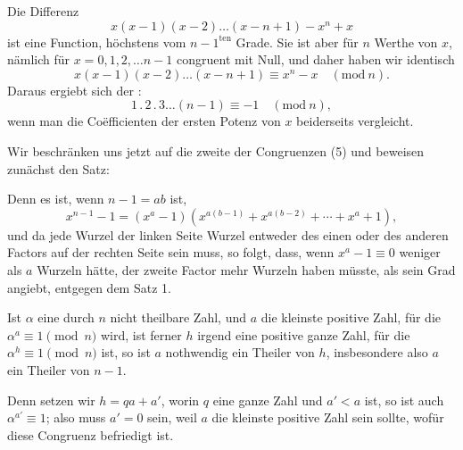 Die Differenz
\[
x(x-1)(x-2)\dots(x-n+1) - x^n + x
\]
ist eine Function, h\"ochstens vom $n-1^{\text{ten}}$ Grade. Sie ist aber
f\"ur $n$ Werthe von $x$, n\"amlich f\"ur $x = 0, 1, 2, \dots n-1$ congruent mit Null, und daher haben wir identisch
\[
x(x-1)(x-2)\dots(x-n+1) \equiv x^n - x \quad (\mathrm{mod}\ n).
\]
Daraus ergiebt sich der :
\[
1\,.\,2\,.\,3\dots(n-1) \equiv -1 \quad (\mathrm{mod}\ n),
\]
wenn man die Co\"efficienten der ersten Potenz von $x$ beiderseits
vergleicht.

Wir beschr\"anken uns jetzt auf die zweite der Congruenzen (5)
und beweisen zun\"achst den Satz:


Denn es ist, wenn $n-1 = ab$ ist,
\[
x^{n-1} - 1 = (x^a - 1)(x^{a(b-1)} + x^{a(b-2)} + \cdots + x^a + 1),
\]
und da jede Wurzel der linken Seite Wurzel entweder des einen
oder des anderen Factors auf der rechten Seite sein muss, so
folgt, dass, wenn $x^a - 1 \equiv 0$ weniger als $a$ Wurzeln h\"atte, der
zweite Factor mehr Wurzeln haben m\"usste, als sein Grad angiebt,
entgegen dem Satz 1.

Ist $\alpha$ eine durch $n$ nicht theilbare Zahl, und $a$ die kleinste
positive Zahl, f\"ur die $\alpha^a \equiv 1 \pmod n$ wird, ist ferner $h$ irgend
eine positive ganze Zahl, f\"ur die $\alpha^h \equiv 1 \pmod n$ ist, so ist $a$
nothwendig ein Theiler von $h$, insbesondere also $a$ ein Theiler
von $n - 1$.

Denn setzen wir $h = qa + a'$, worin $q$ eine ganze Zahl und
$a' < a$ ist, so ist auch $\alpha^{a'} \equiv 1$; also muss $a' = 0$ sein, weil $a$ die
kleinste positive Zahl sein sollte, wof\"ur diese Congruenz befriedigt ist.

